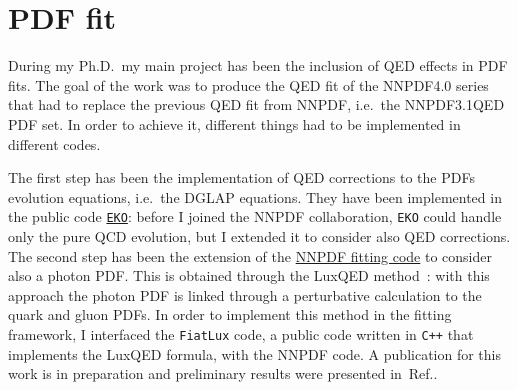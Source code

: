 \documentclass[11pt,a4paper]{moderncv}        %
\begin{document}
\section{PDF fit}

During my Ph.D.\ my main project has been the inclusion of QED effects in PDF fits.
The goal of the work was to produce the QED fit of the NNPDF4.0 series that had to replace the previous QED fit from NNPDF, i.e.\ the NNPDF3.1QED PDF set.
In order to achieve it, different things had to be implemented in different codes.

The first step has been the implementation of QED corrections to the PDFs evolution equations, i.e.\ the DGLAP equations.
They have been implemented in the public code \href{https://github.com/NNPDF/eko}{\texttt{EKO}}:
before I joined the NNPDF collaboration, \texttt{EKO} could handle only the pure QCD evolution, but I extended it to consider also QED corrections.
%
The second step has been the extension of the \href{https://github.com/NNPDF/nnpdf}{NNPDF fitting code} to consider also
a photon PDF.
This is obtained through the LuxQED method~\cite{Manohar:2016nzj, Manohar:2017eqh}: with this approach the photon PDF is linked through
a perturbative calculation to the quark and gluon PDFs.
In order to implement this method in the fitting framework, I interfaced the \texttt{FiatLux} code, 
a public code written in \texttt{C++} that implements the LuxQED formula, with the NNPDF code.
A publication for this work is in preparation and preliminary results were presented in~Ref.\cite{LAURENTI2023}.
\end{document}
